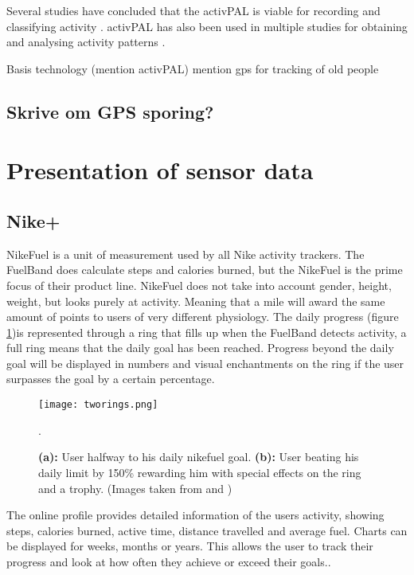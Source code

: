 Several studies have concluded that the activPAL is viable for recording and classifying activity \cite{grant2006, ryan2006, grant2008, tsavourelou}. activPAL has also been used in multiple studies for obtaining and analysing activity patterns \cite{grant2010, lord, ryan2010}.

Basis technology (mention activPAL) mention gps for tracking of old people
\subsection{Skrive om GPS sporing?}

\section{Presentation of sensor data}

\subsection{Nike+}
NikeFuel \cite{nikefuel} is a unit of measurement used by all Nike activity trackers. The FuelBand does calculate steps and calories burned, but the NikeFuel is the prime focus of their product line. NikeFuel does not take into account gender, height, weight, but looks purely at activity. Meaning that a mile will award the same amount of points to users of very different physiology. The daily progress (figure \ref{fig:tworings})is represented through a ring that fills up when the FuelBand detects activity, a full ring means that the daily goal has been reached. Progress beyond the daily goal will be displayed in numbers and visual enchantments on the ring if the user surpasses the goal by a certain percentage.

\begin{figure}[h!]
	\centering
		\texttt{[image: tworings.png]}
		\caption{\footnotesize \textbf{(a):} User halfway to his daily nikefuel goal. \textbf{(b):} User beating his daily limit by 150\% rewarding him with special effects on the ring and a trophy. (Images taken from \cite{fuelbandDcRain} and \cite{fuelbandTechSpce})}.
		\label{fig:tworings}
\end{figure}

The online profile provides detailed information of the users activity, showing steps, calories burned, active time, distance travelled and average fuel. Charts can be displayed for weeks, months or years. This allows the user to track their progress and look at how often they achieve or exceed their goals.\cite{fuelbandTechSpce}.

